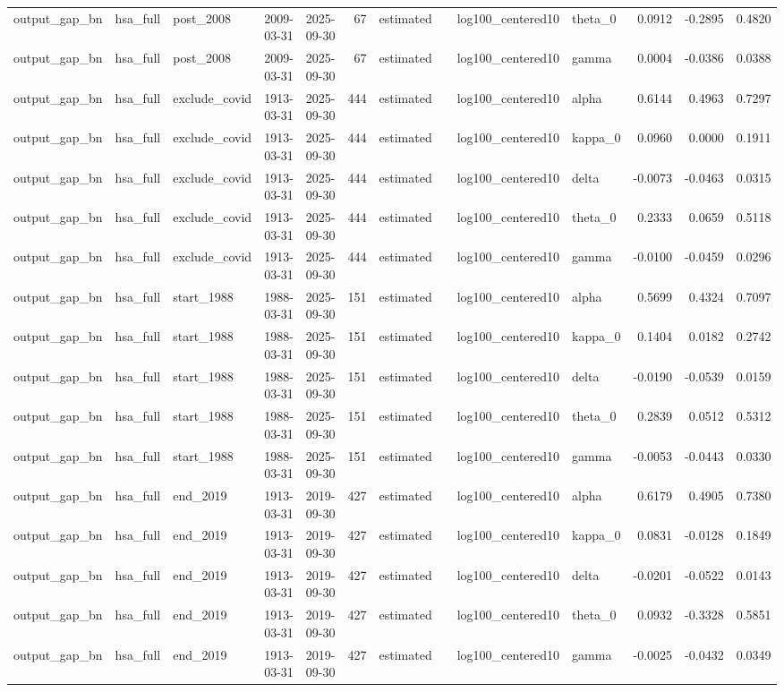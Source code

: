 \begin{tabular}{lllllrllllrrr}
output\_gap\_bn & hsa\_full & post\_2008 & 2009-03-31 & 2025-09-30 & 67 & estimated &  & log100\_centered10 & theta\_0 & 0.0912 & -0.2895 & 0.4820 \\
output\_gap\_bn & hsa\_full & post\_2008 & 2009-03-31 & 2025-09-30 & 67 & estimated &  & log100\_centered10 & gamma & 0.0004 & -0.0386 & 0.0388 \\
output\_gap\_bn & hsa\_full & exclude\_covid & 1913-03-31 & 2025-09-30 & 444 & estimated &  & log100\_centered10 & alpha & 0.6144 & 0.4963 & 0.7297 \\
output\_gap\_bn & hsa\_full & exclude\_covid & 1913-03-31 & 2025-09-30 & 444 & estimated &  & log100\_centered10 & kappa\_0 & 0.0960 & 0.0000 & 0.1911 \\
output\_gap\_bn & hsa\_full & exclude\_covid & 1913-03-31 & 2025-09-30 & 444 & estimated &  & log100\_centered10 & delta & -0.0073 & -0.0463 & 0.0315 \\
output\_gap\_bn & hsa\_full & exclude\_covid & 1913-03-31 & 2025-09-30 & 444 & estimated &  & log100\_centered10 & theta\_0 & 0.2333 & 0.0659 & 0.5118 \\
output\_gap\_bn & hsa\_full & exclude\_covid & 1913-03-31 & 2025-09-30 & 444 & estimated &  & log100\_centered10 & gamma & -0.0100 & -0.0459 & 0.0296 \\
output\_gap\_bn & hsa\_full & start\_1988 & 1988-03-31 & 2025-09-30 & 151 & estimated &  & log100\_centered10 & alpha & 0.5699 & 0.4324 & 0.7097 \\
output\_gap\_bn & hsa\_full & start\_1988 & 1988-03-31 & 2025-09-30 & 151 & estimated &  & log100\_centered10 & kappa\_0 & 0.1404 & 0.0182 & 0.2742 \\
output\_gap\_bn & hsa\_full & start\_1988 & 1988-03-31 & 2025-09-30 & 151 & estimated &  & log100\_centered10 & delta & -0.0190 & -0.0539 & 0.0159 \\
output\_gap\_bn & hsa\_full & start\_1988 & 1988-03-31 & 2025-09-30 & 151 & estimated &  & log100\_centered10 & theta\_0 & 0.2839 & 0.0512 & 0.5312 \\
output\_gap\_bn & hsa\_full & start\_1988 & 1988-03-31 & 2025-09-30 & 151 & estimated &  & log100\_centered10 & gamma & -0.0053 & -0.0443 & 0.0330 \\
output\_gap\_bn & hsa\_full & end\_2019 & 1913-03-31 & 2019-09-30 & 427 & estimated &  & log100\_centered10 & alpha & 0.6179 & 0.4905 & 0.7380 \\
output\_gap\_bn & hsa\_full & end\_2019 & 1913-03-31 & 2019-09-30 & 427 & estimated &  & log100\_centered10 & kappa\_0 & 0.0831 & -0.0128 & 0.1849 \\
output\_gap\_bn & hsa\_full & end\_2019 & 1913-03-31 & 2019-09-30 & 427 & estimated &  & log100\_centered10 & delta & -0.0201 & -0.0522 & 0.0143 \\
output\_gap\_bn & hsa\_full & end\_2019 & 1913-03-31 & 2019-09-30 & 427 & estimated &  & log100\_centered10 & theta\_0 & 0.0932 & -0.3328 & 0.5851 \\
output\_gap\_bn & hsa\_full & end\_2019 & 1913-03-31 & 2019-09-30 & 427 & estimated &  & log100\_centered10 & gamma & -0.0025 & -0.0432 & 0.0349 \\
\bottomrule
\end{tabular}
